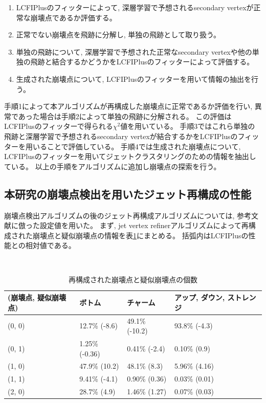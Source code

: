 \begin{enumerate}
 \item LCFIPlusのフィッターによって, 深層学習で予想されるsecondary vertexが正常な崩壊点であるか評価する。
 \item 正常でない崩壊点を飛跡に分解し, 単独の飛跡として取り扱う。
 \item 単独の飛跡について, 深層学習で予想された正常なsecondary vertexや他の単独の飛跡と結合するかどうかをLCFIPlusのフィッターによって評価する。
 \item 生成された崩壊点について, LCFIPlusのフィッターを用いて情報の抽出を行う。
\end{enumerate}

手順1によって本アルゴリズムが再構成した崩壊点に正常であるか評価を行い, 異常であった場合は手順2によって単独の飛跡に分解される。
この評価はLCFIPlusのフィッターで得られる$\chi^2$値を用いている。
手順3ではこれら単独の飛跡と深層学習で予想されるsecondary vertexが結合するかをLCFIPlusのフィッターを用いることで評価している。
手順4では生成された崩壊点について, LCFIPlusのフィッターを用いてジェットクラスタリングのための情報を抽出している。
以上の手順をアルゴリズムに追加し崩壊点の探索を行う。

\subsection{本研究の崩壊点検出を用いたジェット再構成の性能} \label{Com:FlaTagCom:PerformanceofFlavorTagging}

崩壊点検出アルゴリズムの後のジェット再構成アルゴリズムについては, 参考文献\cite{LCFIPlusPaper}に倣った設定値を用いた。
まず, jet vertex refinerアルゴリズムによって再構成された崩壊点と疑似崩壊点の情報を表\ref{TheNumberofReconstructedVertices}にまとめる。
括弧内はLCFIPlusの性能との相対値である。

\begin{table}[htb]
 \centering
　\small
  \caption{再構成された崩壊点と疑似崩壊点の個数}
  \begin{tabular}{l l l l}\hline
    (崩壊点, 疑似崩壊点) & ボトム & チャーム & アップ, ダウン, ストレンジ\\\hline\hline
    (0, 0) & 12.7\% (-8.6) & 49.1\% (-10.2) & 93.8\% (-4.3)\\
    (0, 1) & 1.25\% (-0.36) & 0.41\% (-2.4) & 0.10\% (0.9)\\
    (1, 0) & 47.9\% (10.2) & 48.1\% (8.3) & 5.96\% (4.16)\\
    (1, 1) & 9.41\% (-4.1) & 0.90\% (0.36) & 0.03\% (0.01)\\
    (2, 0) & 28.7\% (4.9) & 1.46\% (1.27) & 0.07\% (0.03)\\\hline
  \end{tabular}
  \label{TheNumberofReconstructedVertices}
\end{table}

